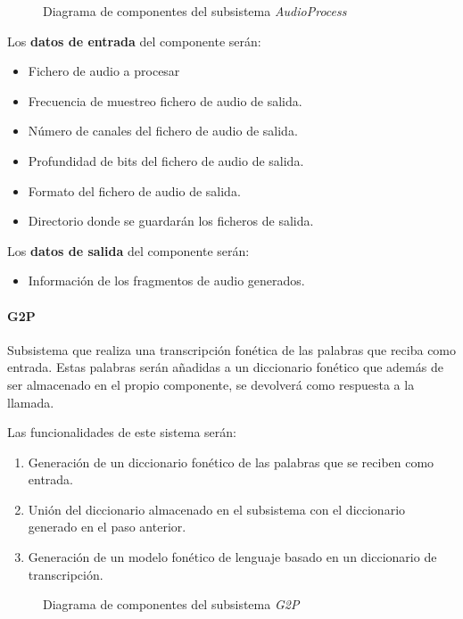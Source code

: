 \documentclass[../main.tex]{subfiles}
\begin{document}
\begin{figure}[H]
    \centering
    
    \label{fig:components_audioprocess}
    \caption{Diagrama de componentes del subsistema \textit{AudioProcess}}
\end{figure}

Los \textbf{datos de entrada} del componente serán:
\begin{itemize}
    \item Fichero de audio a procesar
    \item Frecuencia de muestreo fichero de audio de salida.    
    \item Número de canales del fichero de audio de salida.
    \item Profundidad de bits del fichero de audio de salida.
    \item Formato del fichero de audio de salida.
    \item Directorio donde se guardarán los ficheros de salida.
\end{itemize}

Los \textbf{datos de salida} del componente serán:
\begin{itemize}
    \item Información de los fragmentos de audio generados.
\end{itemize}

\paragraph{G2P}\label{par:g2p}
Subsistema que realiza una transcripción fonética de las palabras que reciba como entrada. Estas palabras serán añadidas a un diccionario fonético que además de ser almacenado en el propio componente, se devolverá como respuesta a la llamada.

Las funcionalidades de este sistema serán:
\begin{enumerate}
    \item Generación de un diccionario fonético de las palabras que se reciben como entrada.
    \item Unión del diccionario almacenado en el subsistema con el diccionario generado en el paso anterior.
    \item Generación de un modelo fonético de lenguaje basado en un diccionario de transcripción.
\end{enumerate}

\begin{figure}[H]
    \centering
    
    \label{fig:components_g2p}
    \caption{Diagrama de componentes del subsistema \textit{G2P}}
\end{figure}
\end{document}

